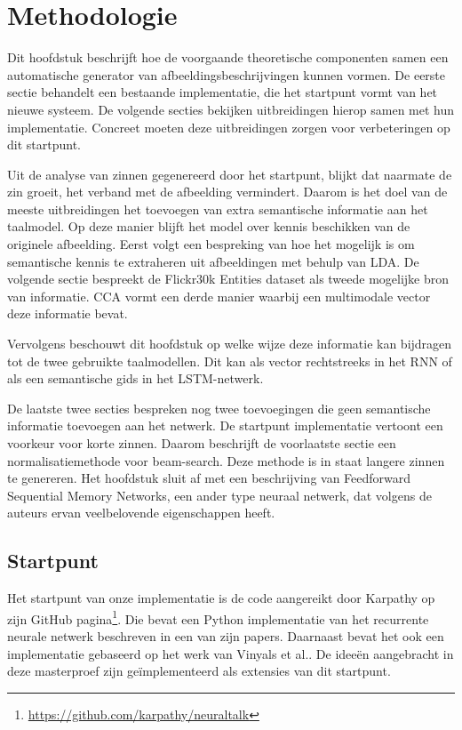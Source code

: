 \chapter{Methodologie}
\label{hst-meth}

Dit hoofdstuk beschrijft hoe de voorgaande theoretische componenten samen een automatische generator van afbeeldingsbeschrijvingen kunnen vormen. De eerste sectie behandelt een bestaande implementatie, die het startpunt vormt van het nieuwe systeem. De volgende secties bekijken uitbreidingen hierop samen met hun implementatie. Concreet moeten deze uitbreidingen zorgen voor verbeteringen op dit startpunt.

Uit de analyse van zinnen gegenereerd door het startpunt, blijkt dat naarmate de zin groeit, het verband met de afbeelding vermindert. Daarom is het doel van de meeste uitbreidingen het toevoegen van extra semantische informatie aan het taalmodel. Op deze manier blijft het model over kennis beschikken van de originele afbeelding. Eerst volgt een bespreking van hoe het mogelijk is om semantische kennis te extraheren uit afbeeldingen met behulp van LDA. De volgende sectie bespreekt de Flickr30k Entities dataset als tweede mogelijke bron van informatie. CCA vormt een derde manier waarbij een multimodale vector deze informatie bevat.

Vervolgens beschouwt dit hoofdstuk op welke wijze deze informatie kan bijdragen tot de twee gebruikte taalmodellen. Dit kan als vector rechtstreeks in het RNN of als een semantische gids in het LSTM-netwerk. 

De laatste twee secties bespreken nog twee toevoegingen die geen semantische informatie toevoegen aan het netwerk. De startpunt implementatie vertoont een voorkeur voor korte zinnen. Daarom beschrijft de voorlaatste sectie een normalisatiemethode voor beam-search. Deze methode is in staat langere zinnen te genereren. Het hoofdstuk sluit af met een beschrijving van Feedforward Sequential Memory Networks, een ander type neuraal netwerk, dat volgens de auteurs ervan veelbelovende eigenschappen heeft.


\section{Startpunt}
Het startpunt van onze implementatie is de code aangereikt door Karpathy op zijn GitHub pagina\footnote{\url{https://github.com/karpathy/neuraltalk}}. Die bevat een Python implementatie van het recurrente neurale netwerk beschreven in een van zijn papers\cite{Karpathy2015}. Daarnaast bevat het ook een implementatie gebaseerd op het werk van Vinyals et al.\cite{Google}. De idee\"en aangebracht in deze masterproef zijn ge\"implementeerd als extensies van dit startpunt.


